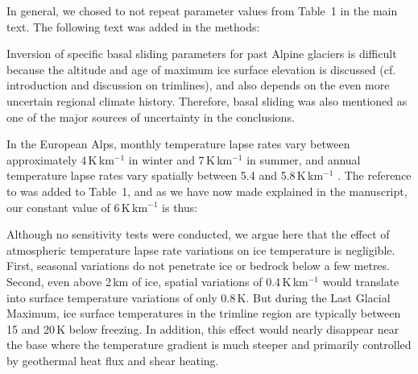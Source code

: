     In general, we chosed to not repeat parameter values from Table~1 in the
    main text. The following text was added in the methods:


    Inversion of specific basal sliding parameters for past Alpine glaciers
    is difficult because the altitude and age of maximum ice surface elevation
    is discussed (cf. introduction and discussion on trimlines), and also
    depends on the even more uncertain regional climate history.  Therefore,
    basal sliding was also mentioned as one of the major sources of
    uncertainty in the conclusions.

 

    In the European Alps, monthly temperature lapse rates vary between
    approximately 4\,K\,km$^{-1}$ in winter and 7\,K\,km$^{-1}$ in summer, and
    annual temperature lapse rates vary spatially between 5.4 and
    5.8\,K\,km$^{-1}$ \citep{Rolland.2003}. The reference to
    \citet{Rolland.2003} was added to Table~1, and as we have now made
    explained in the manuscript, our constant value of 6\,K\,km$^{-1}$ is thus:


    Although no sensitivity tests were conducted, we argue here that the effect
    of atmospheric temperature lapse rate variations on ice temperature is
    negligible. First, seasonal variations do not penetrate ice or bedrock
    below a few metres. Second, even above 2\,km of ice, spatial variations of
    0.4\,K\,km$^{-1}$ would translate into surface temperature variations of
    only 0.8\,K. But during the Last Glacial Maximum, ice surface temperatures
    in the trimline region are typically between 15 and 20\,K below freezing.
    In addition, this effect would nearly disappear near the base where the
    temperature gradient is much steeper and primarily controlled by geothermal
    heat flux and shear heating.


